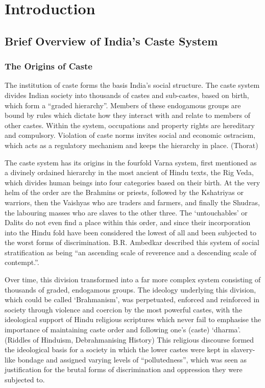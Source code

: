 \documentclass[12pt,a4paper,titlepage]{report}
\date{}
\begin{document}
\chapter{Introduction}\label{introduction}

\section{Brief Overview of India's Caste
System}\label{brief-overview-of-indias-caste-system}

\subsection{The Origins of Caste}\label{the-origins-of-caste}

The institution of caste forms the basis India's social structure. The
caste system divides Indian society into thousands of castes and
sub-castes, based on birth, which form a ``graded hierarchy''. Members
of these endogamous groups are bound by rules which dictate how they
interact with and relate to members of other castes. Within the system,
occupations and property rights are hereditary and compulsory. Violation
of caste norms invites social and economic ostracism, which acts as a
regulatory mechanism and keeps the hierarchy in place. (Thorat)

The caste system has its origins in the fourfold Varna system, first
mentioned as a divinely ordained hierarchy in the most ancient of Hindu
texts, the Rig Veda, which divides human beings into four categories
based on their birth. At the very helm of the order are the Brahmins or
priests, followed by the Kshatriyas or warriors, then the Vaishyas who
are traders and farmers, and finally the Shudras, the labouring masses
who are slaves to the other three. The `untouchables' or Dalits do not
even find a place within this order, and since their incorporation into
the Hindu fold have been considered the lowest of all and been subjected
to the worst forms of discrimination. B.R. Ambedkar described this
system of social stratification as being ``an ascending scale of
reverence and a descending scale of contempt.''.

Over time, this division transformed into a far more complex system
consisting of thousands of graded, endogamous groups. The ideology
underlying this division, which could be called `Brahmanism', was
perpetuated, enforced and reinforced in society through violence and
coercion by the most powerful castes, with the ideological support of
Hindu religious scriptures which never fail to emphasise the importance
of maintaining caste order and following one's (caste) `dharma'.
(Riddles of Hinduism, Debrahmanising History) This religious discourse
formed the ideological basis for a society in which the lower castes
were kept in slavery-like bondage and assigned varying levels of
``pollutedness'', which was seen as justification for the brutal forms
of discrimination and oppression they were subjected to.
\end{document}

